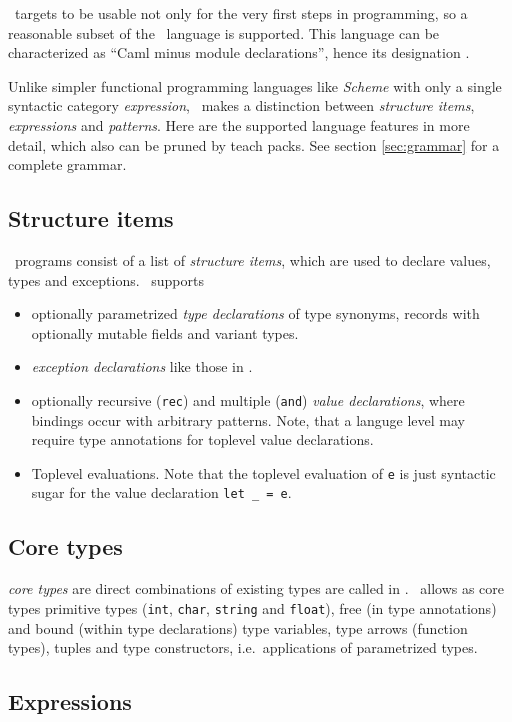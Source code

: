 \easyocaml\ targets to be usable not only for the very first steps in
programming, so a reasonable subset of the \ocaml\ language is supported.
This language can be characterized as ``Caml minus module declarations'',
hence its designation \camlm.

Unlike simpler functional programming languages like \textit{Scheme} with only
a single syntactic category \emph{expression}, \ocaml\ makes a distinction
between \emph{structure items}, \emph{expressions} and \emph{patterns}.  Here
are the supported language features in more detail, which also can be pruned by
teach packs. See section \ref{sec:grammar} for a complete grammar.


\subsection*{Structure items}

\ocaml\ programs consist of a list of \emph{structure items}, which are used to
declare values, types and exceptions.
\easyocaml\ supports
\begin{itemize}
  \item optionally parametrized \emph{type declarations} of type synonyms,
    records with optionally mutable fields and variant types.
  \item \emph{exception declarations} like those in \ocaml.
  \item optionally recursive (\texttt{rec}) and multiple (\texttt{and})
    \emph{value declarations}, where bindings occur with arbitrary patterns.
    Note, that a languge level may require type annotations for toplevel value
    declarations.
  \item Toplevel evaluations. Note that the toplevel evaluation of \texttt{e} is just
    syntactic sugar for the value declaration \texttt{let \_ = e}.
\end{itemize}

\subsection*{Core types}
\emph{core types} are direct combinations of existing types are called in \ocaml.
\easyocaml\ allows as core types primitive types (\texttt{int}, \texttt{char},
\texttt{string} and \texttt{float}), free (in type annotations) and bound
(within type declarations) type variables, type arrows (function types), tuples
and type constructors, i.e.\ applications of parametrized types.

\subsection*{Expressions}

